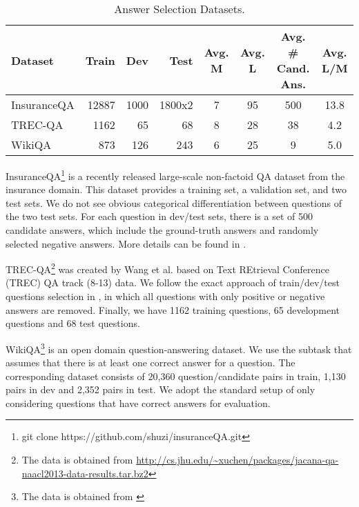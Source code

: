 \documentclass{article}
\begin{document}
\begin{table*}[ht]
\caption{Answer Selection Datasets.}
\label{as:datasets}
\vskip 0.15in
\begin{center}
\begin{small}
\begin{sc}
\begin{tabular}{lrrrcccc}
\hline
\abovespace\belowspace
Dataset  & Train & Dev  & Test  & Avg. M  & Avg. L & Avg. \# Cand. Ans. & Avg. L/M \\
\hline
\abovespace
InsuranceQA & 12887 & 1000 & 1800x2 & 7 & 95 & 500 & 13.8 \\ 
TREC-QA      & 1162 & 65 & 68  & 8 & 28  & 38 & 4.2 \\ 
WikiQA       & 873 & 126 & 243 & 6 & 25 & 9 & 5.0 \\
\hline
\end{tabular}
\end{sc}
\end{small}
\end{center}
\vskip -0.1in
\end{table*}


InsuranceQA\footnote{git clone https://github.com/shuzi/insuranceQA.git} is a recently released large-scale non-factoid QA dataset from the insurance domain. This dataset provides a training set, a validation set, and two test sets. We do not see obvious categorical differentiation between questions of the two test sets. For each question in dev/test sets, there is a set of 500 candidate answers, which include the ground-truth answers and randomly selected negative answers. More details can be found in \cite{feng2015applying}. 

TREC-QA\footnote{The data is obtained from \cite{yao2013} \url{http://cs.jhu.edu/~xuchen/packages/jacana-qa-naacl2013-data-results.tar.bz2}}
was created by Wang et al.  based on Text REtrieval Conference
(TREC) QA track (8-13) data. We follow the exact approach of train/dev/test questions selection in
\cite{wang2015}, in which all questions with only positive or negative answers are removed.
Finally, we have 1162 training questions, 65 development questions and 68 test questions.

WikiQA\footnote{The data is obtained from \cite{yang2015}} is an open domain question-answering
dataset. We use the subtask that assumes that there is at least one correct answer for a question. The
corresponding dataset consists of 20,360 question/candidate pairs in train, 
1,130 pairs in dev and 2,352
pairs in test.  
We adopt the standard setup of only considering questions that have correct answers
for evaluation. 
\end{document}
